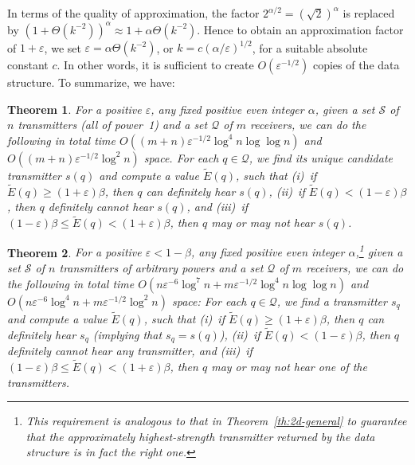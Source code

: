 \documentclass[11pt]{article}
\newtheorem{theorem}{Theorem}[section]
\theoremstyle{remark}
\def\Q{\mathcal{Q}}
\def\S{\mathcal{S}}
\def\EE{\tilde{E}}
\let\eps\varepsilon
\begin{document}
In terms of the quality of approximation, the factor 
$2^{\alpha/2} = (\sqrt2)^\alpha$ is replaced by
$(1+\Theta(k^{-2}))^\alpha \approx 1+\alpha \Theta(k^{-2})$. 
Hence to obtain an approximation factor of $1+\eps$, we set
$\eps = \alpha \Theta(k^{-2})$, or $k=c(\alpha/\eps)^{1/2}$, for a suitable absolute constant $c$.
In other words, it is sufficient to create $O(\eps^{-1/2})$ copies of the data structure.  To summarize, we have:

\begin{theorem}
  \label{th:2d-general-uniform-ptas}
  For a positive $\eps$, any fixed positive even integer $\alpha$, given a set $\S$ of $n$
  transmitters (all of power~1) and a set $\Q$ of $m$ receivers, we can do the following in 
  total time $O((m+n) \eps^{-1/2} \log^4 n \log \log n)$ and $O((m+n) \eps^{-1/2} \log^2 n)$ space.
For each $q \in \Q$, we find 
  its unique candidate transmitter $s(q)$ and compute a value $\EE(q)$, such that (i)~if $\EE(q) \ge (1+\eps)\beta$,
  then $q$ can definitely hear $s(q)$, (ii)~if $\EE(q) < (1-\eps)\beta$, then $q$ definitely cannot hear $s(q)$, and 
  (iii)~if $(1-\eps)\beta \le \EE(q) < (1+\eps)\beta$, then $q$ may or may not hear $s(q)$.
\end{theorem}

\begin{theorem}
  \label{th:2d-general-ptas}
  For a positive $\eps<1 -\beta$, any fixed positive even integer $\alpha$,\footnote{This requirement is analogous to that in Theorem~\ref{th:2d-general} to guarantee that the approximately highest-strength transmitter returned by the data structure is in fact the right one.}
  given a set $\S$ of $n$
  transmitters of arbitrary powers and a set $\Q$ of $m$ receivers, we can do the following in 
  total time $O(n \eps^{-6} \log^7 n + m \eps^{-1/2}\log^4 n \log \log n)$ and $O(n \eps^{-6}\log^4 n + m \eps ^{-1/2}\log^2 n)$ space: For each $q \in \Q$, we find 
  a transmitter $s_q$ and compute a value $\EE(q)$, such that (i)~if $\EE(q) \ge (1+\eps)\beta$,
  then $q$ can definitely hear $s_q$ (implying that $s_q=s(q)$), (ii)~if $\EE(q) < (1-\eps)\beta$, then $q$ definitely cannot hear any transmitter, and 
  (iii)~if $(1-\eps)\beta \le \EE(q) < (1+\eps)\beta$, then $q$ may or may not hear one of the transmitters.
\end{theorem}
\end{document}
